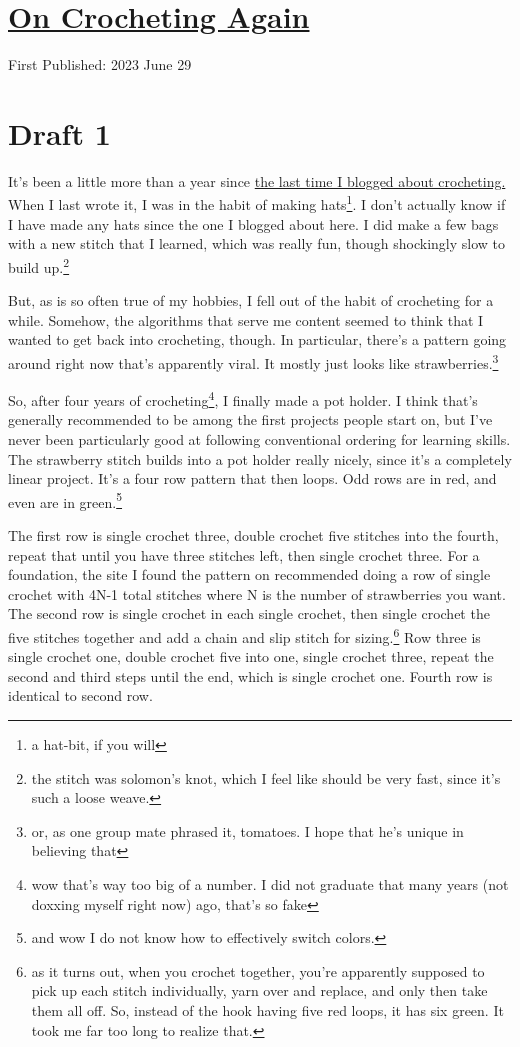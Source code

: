 \documentclass[12pt]{article}[titlepage]
\newcommand{\1}{\={a}}
\newcommand{\2}{\={e}}
\newcommand{\3}{\={\i}}
\newcommand{\4}{\=o}
\newcommand{\5}{\=u}
\newcommand{\6}{\={A}}
\renewcommand{\,}{\textsuperscript{,}}
\begin{document}
\doublespacing
\section{\href{crochet-2.html}{On Crocheting Again}}
First Published: 2023 June 29


\section{Draft 1}
It's been a little more than a year since \href{crocheting-1.html}{the last time I blogged about crocheting.}
When I last wrote it, I was in the habit of making hats\footnote{a hat-bit, if you will}.
I don't actually know if I have made any hats since the one I blogged about here.
I did make a few bags with a new stitch that I learned, which was really fun, though shockingly slow to build up.\footnote{the stitch was solomon's knot, which I feel like should be very fast, since it's such a loose weave.}

But, as is so often true of my hobbies, I fell out of the habit of crocheting for a while.
Somehow, the algorithms that serve me content seemed to think that I wanted to get back into crocheting, though.
In particular, there's a pattern going around right now that's apparently viral.
It mostly just looks like strawberries.\footnote{or, as one group mate phrased it, tomatoes. I hope that he's unique in believing that}

So, after four years of crocheting\footnote{wow that's way too big of a number. I did not graduate that many years (not doxxing myself right now) ago, that's so fake}, I finally made a pot holder.
I think that's generally recommended to be among the first projects people start on, but I've never been particularly good at following conventional ordering for learning skills.
The strawberry stitch builds into a pot holder really nicely, since it's a completely linear project.
It's a four row pattern that then loops.
Odd rows are in red, and even are in green.\footnote{and wow I do not know how to effectively switch colors.}

The first row is single crochet three, double crochet five stitches into the fourth, repeat that until you have three stitches left, then single crochet three.
For a foundation, the site I found the pattern on recommended doing a row of single crochet with 4N-1 total stitches where N is the number of strawberries you want.
The second row is single crochet in each single crochet, then single crochet the five stitches together and add a chain and slip stitch for sizing.\footnote{as it turns out, when you crochet together, you're apparently supposed to pick up each stitch individually, yarn over and replace, and only then take them all off. So, instead of the hook having five red loops, it has six green. It took me far too long to realize that.}
Row three is single crochet one, double crochet five into one, single crochet three, repeat the second and third steps until the end, which is single crochet one.
Fourth row is identical to second row.
\end{document}
